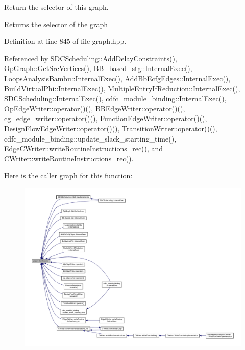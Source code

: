 Return the selector of this graph. 

\begin{DoxyReturn}{Returns}
the selector of the graph 
\end{DoxyReturn}


Definition at line 845 of file graph.\+hpp.



Referenced by S\+D\+C\+Scheduling\+::\+Add\+Delay\+Constraints(), Op\+Graph\+::\+Get\+Src\+Vertices(), B\+B\+\_\+based\+\_\+stg\+::\+Internal\+Exec(), Loops\+Analysis\+Bambu\+::\+Internal\+Exec(), Add\+Bb\+Ecfg\+Edges\+::\+Internal\+Exec(), Build\+Virtual\+Phi\+::\+Internal\+Exec(), Multiple\+Entry\+If\+Reduction\+::\+Internal\+Exec(), S\+D\+C\+Scheduling\+::\+Internal\+Exec(), cdfc\+\_\+module\+\_\+binding\+::\+Internal\+Exec(), Op\+Edge\+Writer\+::operator()(), B\+B\+Edge\+Writer\+::operator()(), cg\+\_\+edge\+\_\+writer\+::operator()(), Function\+Edge\+Writer\+::operator()(), Design\+Flow\+Edge\+Writer\+::operator()(), Transition\+Writer\+::operator()(), cdfc\+\_\+module\+\_\+binding\+::update\+\_\+slack\+\_\+starting\+\_\+time(), Edge\+C\+Writer\+::write\+Routine\+Instructions\+\_\+rec(), and C\+Writer\+::write\+Routine\+Instructions\+\_\+rec().

Here is the caller graph for this function\+:
\nopagebreak
\begin{figure}[H]
\begin{center}
\leavevmode
\includegraphics[width=350pt]{d5/d15/structgraph_a057f3ce254542cbe465949b1bb9c08c1_icgraph}
\end{center}
\end{figure}
\mbox{\label{structgraph_af5ca0d5731ee65e1a05b13baccddd529}} 
